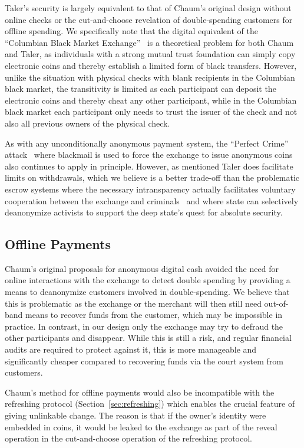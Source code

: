 \documentclass{llncs}
\begin{document}
Taler's security is largely equivalent to that of Chaum's original
design without online checks or the cut-and-choose revelation of
double-spending customers for offline spending.
We specifically note that the digital equivalent of the ``Columbian
Black Market Exchange''~\cite{fatf1997} is a theoretical problem for
both Chaum and Taler, as individuals with a strong mutual trust
foundation can simply copy electronic coins and thereby establish a
limited form of black transfers.  However, unlike the situation with
physical checks with blank recipients in the Columbian black market,
the transitivity is limited as each participant can deposit the electronic
coins and thereby cheat any other participant, while in the Columbian
black market each participant only needs to trust the issuer of the
check and not also all previous owners of the physical check.

As with any unconditionally anonymous payment system, the ``Perfect
Crime'' attack~\cite{solms1992perfect} where blackmail is used to
force the exchange to issue anonymous coins also continues to apply in
principle.  However, as mentioned Taler does facilitate limits on
withdrawals, which we believe is a better trade-off than the
problematic escrow systems where the necessary intransparency
actually facilitates voluntary cooperation between the exchange and
criminals~\cite{sander1999escrow} and where state can selectively
deanonymize activists to support the deep state's quest for absolute
security.

\subsection{Offline Payments}

Chaum's original proposals for anonymous digital cash avoided the need
for online interactions with the exchange to detect double spending by
providing a means to deanonymize customers involved in
double-spending.  We believe that this is problematic as the exchange or
the merchant will then still need out-of-band means to recover funds
from the customer, which may be impossible in practice.  In contrast,
in our design only the exchange may try to defraud the other participants
and disappear.  While this is still a risk, and regular financial
audits are required to protect against it, this is more manageable and
significantly cheaper compared to recovering funds via the court
system from customers.

Chaum's method for offline payments would also be incompatible with
the refreshing protocol (Section~\ref{sec:refreshing}) which enables
the crucial feature of giving unlinkable change.  The reason is that
if the owner's identity were embedded in coins, it would be leaked to
the exchange as part of the reveal operation in the cut-and-choose
operation of the refreshing protocol.
\end{document}
